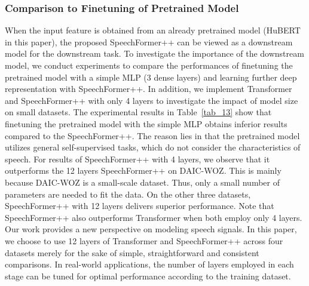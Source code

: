 \documentclass[lettersize,journal]{IEEEtran}
\begin{document}
\subsubsection{Comparison to Finetuning of Pretrained Model}
When the input feature is obtained from an already pretrained model (HuBERT in this paper), the proposed SpeechFormer++ can be viewed as a downstream model for the downstream task. To investigate the importance of the downstream model, we conduct experiments to compare the performances of finetuning the pretrained model with a simple MLP (3 dense layers) and learning further deep representation with SpeechFormer++. In addition, we implement Transformer and SpeechFormer++ with only 4 layers to investigate the impact of model size on small datasets. The experimental results in Table~\ref{tab_13} show that finetuning the pretrained model with the simple MLP obtains inferior results compared to the SpeechFormer++. The reason lies in that the pretrained model utilizes general self-supervised tasks, which do not consider the characteristics of speech. For results of SpeechFormer++ with 4 layers, we observe that it outperforms the 12 layers SpeechFormer++ on DAIC-WOZ. This is mainly because DAIC-WOZ is a small-scale dataset. Thus, only a small number of parameters are needed to fit the data. On the other three datasets, SpeechFormer++ with 12 layers delivers superior performance. Note that SpeechFormer++ also outperforms Transformer when both employ only 4 layers. Our work provides a new perspective on modeling speech signals. In this paper, we choose to use 12 layers of Transformer and SpeechFormer++ across four datasets merely for the sake of simple, straightforward and consistent comparisons. In real-world applications, the number of layers employed in each stage can be tuned for optimal performance according to the training dataset.
\end{document}
